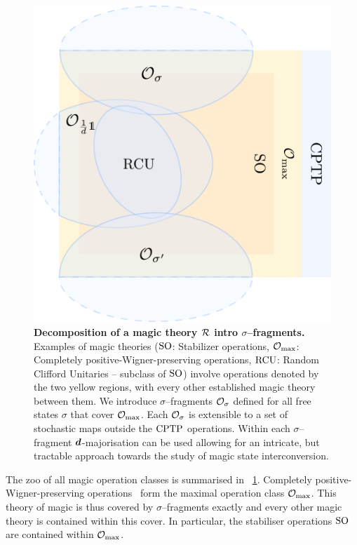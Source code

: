 \documentclass[pra,
aps,
twocolumn,
superscriptaddress,
groupedaddress,
nofootinbib,
reprint
]{revtex4-1}
\begin{document}
\begin{figure}[t]
    \centering
        \includegraphics[scale=0.3
        ]{figs/operations.pdf}
    \caption{\textbf{Decomposition of a magic theory $\mathcal{R}$ intro $\sigma$--fragments.} 
	Examples of magic theories (${\rm{SO}}$: Stabilizer operations, $\mathcal{O}_{\rm{max}}$: Completely positive-Wigner-preserving operations, ${\rm{RCU}}$: Random Clifford Unitaries -- subclass of ${\rm{SO}}$) involve operations denoted by the two yellow regions, with every other established magic theory  between them.
    We introduce $\sigma$--fragments $\mathcal{O}_\sigma$ defined for all free states $\sigma$ that cover $\mathcal{O}_{\rm{max}}$. 
    Each $\mathcal{O}_\sigma$ is extensible to a set of stochastic maps outside the ${\rm{CPTP}}$ operations.
    Within each $\sigma$--fragment $\bm{d}$-majorisation can be used allowing for an intricate, but tractable approach towards the study of magic state interconversion.
    }
    \label{fig:zoo}
\end{figure}

The zoo of all magic operation classes is summarised in ~\cref{fig:zoo}.
Completely positive-Wigner-preserving operations~\cite{cit:wang} form the maximal operation class $\mathcal{O}_{\rm{max}}$.
This theory of magic is thus covered by $\sigma$--fragments exactly and every other magic theory is contained within this cover.
In particular, the stabiliser operations ${\rm{SO}}$ are contained within $\mathcal{O}_{\rm{max}}$.
\end{document}
